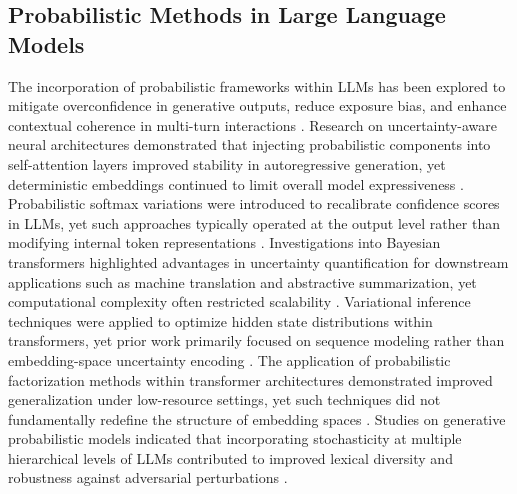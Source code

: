 \documentclass{article}
\begin{document}
\subsection{Probabilistic Methods in Large Language Models}
The incorporation of probabilistic frameworks within LLMs has been explored to mitigate overconfidence in generative outputs, reduce exposure bias, and enhance contextual coherence in multi-turn interactions \cite{chester2024contextual}. Research on uncertainty-aware neural architectures demonstrated that injecting probabilistic components into self-attention layers improved stability in autoregressive generation, yet deterministic embeddings continued to limit overall model expressiveness \cite{roberts2024extending}. Probabilistic softmax variations were introduced to recalibrate confidence scores in LLMs, yet such approaches typically operated at the output level rather than modifying internal token representations \cite{nobre2024optimizing}. Investigations into Bayesian transformers highlighted advantages in uncertainty quantification for downstream applications such as machine translation and abstractive summarization, yet computational complexity often restricted scalability \cite{mcintosh2023culturally}. Variational inference techniques were applied to optimize hidden state distributions within transformers, yet prior work primarily focused on sequence modeling rather than embedding-space uncertainty encoding \cite{radcliffe2024automated}. The application of probabilistic factorization methods within transformer architectures demonstrated improved generalization under low-resource settings, yet such techniques did not fundamentally redefine the structure of embedding spaces \cite{shofman2024negative}. Studies on generative probabilistic models indicated that incorporating stochasticity at multiple hierarchical levels of LLMs contributed to improved lexical diversity and robustness against adversarial perturbations \cite{cabeleireiro2024dynamic}.
\end{document}
